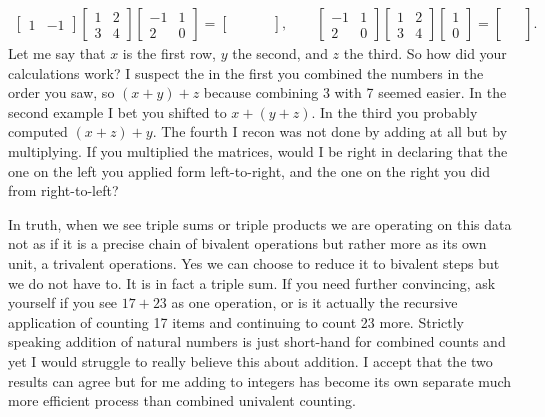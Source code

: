 \begin{align*}
    \begin{bmatrix}
        1 & -1 
    \end{bmatrix}
    \begin{bmatrix}
        1 & 2 \\ 3 & 4 
    \end{bmatrix}
    \begin{bmatrix}
        -1 & 1 \\
        2 & 0
    \end{bmatrix}=\begin{bmatrix} \phantom{\Box} & \phantom{\Box} \end{bmatrix},
    \qquad
    \begin{bmatrix}
        -1 & 1 \\
        2 & 0
    \end{bmatrix}
    \begin{bmatrix}
        1 & 2 \\ 3 & 4 
    \end{bmatrix}
    \begin{bmatrix}
        1 \\ 0 
    \end{bmatrix}=
    \begin{bmatrix}
        \phantom{\Box} \\ \phantom{\Box}\end{bmatrix}.
\end{align*}
Let me say that $x$ is the first row, 
$y$ the second, and $z$ the third.  So how did your calculations 
work?  I suspect the in the first you combined the numbers in the 
order you saw, so $(x+y)+z$ because combining 3 with 7 seemed easier.
In the second example I bet you shifted to $x+(y+z)$.  In the third 
you probably computed $(x+z)+y$.  The fourth I recon was not done by 
adding at all but by multiplying.  If you multiplied the matrices,
would I be right in declaring that the one on the left you applied form 
left-to-right, and the one on the right you did from right-to-left?

In truth, when we see triple sums or triple products we are operating 
on this data not as if it is a precise chain of bivalent operations but 
rather more as its own unit, a trivalent operations.  Yes we can choose to reduce 
it to bivalent steps but we do not have to.  It is in fact a triple sum.
If you need further convincing, ask yourself if you see $17+23$ as one 
operation, or is it actually the recursive application of counting 
17 items and continuing to count 23 more.  Strictly speaking addition 
of natural numbers is just short-hand for combined counts and yet I 
would struggle to really believe this about addition.  I accept that 
the two results can agree but for me adding to integers has become its 
own separate much more efficient process than combined univalent counting.

